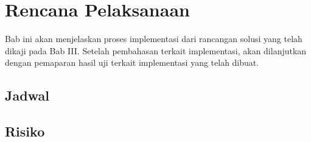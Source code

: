 \chapter{Rencana Pelaksanaan}

Bab ini akan menjelaskan proses implementasi dari rancangan solusi yang telah dikaji pada Bab III. Setelah pembahasan terkait implementasi, akan dilanjutkan dengan pemaparan hasil uji terkait implementasi yang telah dibuat.






\section{Jadwal}
\label{sec:jadwal}


\section{Risiko}
\label{sec:risiko}


